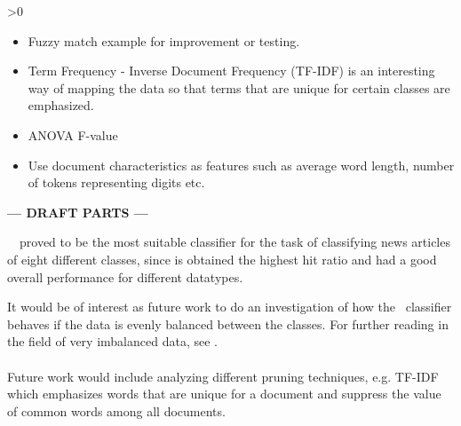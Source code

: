 \ifnum\printdraft>0
	\begin{itemize}
		\item Fuzzy match example for improvement or testing.
		\item Term Frequency - Inverse Document Frequency (TF-IDF) is an interesting way of mapping the data so that terms that are unique for certain classes are emphasized.
		\item ANOVA F-value
		\item Use document characteristics as features such as average word length, number of tokens representing digits etc.
	\end{itemize}
\else
\begin{center}
	\textbf{--- DRAFT PARTS ---}
\end{center}
\fi
\mn\ \nb\ proved to be the most suitable classifier for the task of classifying news articles of eight different classes, since is obtained the highest hit ratio and had a good overall performance for different datatypes.

It would be of interest as future work to do an investigation of how the \rf\ classifier behaves if the data is evenly balanced between the classes. For further reading in the field of very imbalanced data, see \cite{Chen}.
\\\\
Future work would include analyzing different pruning techniques, e.g. TF-IDF which emphasizes words that are unique for a document and suppress the value of common words among all documents. 
